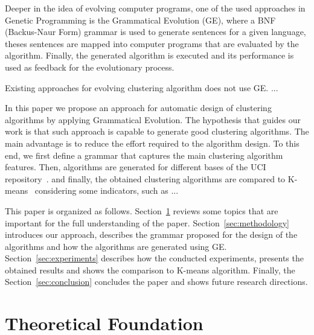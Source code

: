 \documentclass[journal]{IEEEtran}
\begin{document}
	Deeper in the idea of evolving computer programs, one of the used approaches in Genetic Programming is the Grammatical Evolution (GE), where a BNF (Backus-Naur Form) grammar is used to generate sentences for a given language, theses sentences are mapped into  computer programs that are evaluated by the algorithm. Finally, the generated algorithm is executed and its performance is used as feedback for the evolutionary process.
	
        Existing approaches for evolving clustering algorithm does not use GE. ...



In this paper we propose an approach for automatic design of clustering algorithms by applying Grammatical Evolution. The hypothesis that guides our work is that such approach is capable to generate good clustering algorithms. The main advantage is to reduce the effort required to the algorithm design. To this end, we first define a grammar that captures the main clustering algorithm features. Then, algorithms are generated for different bases of the UCI repository~\cite{}. and finally, the obtained clustering algorithms are compared to K-means~\cite{} considering some indicators, such as ...


	
     This paper is organized as follows. Section~\ref{sec:theoretical_foudation} reviews some topics that are important for the full understanding of the paper. Section~\ref{sec:methodology} introduces our approach,  describes the grammar proposed for the design of the algorithms and how the algorithms are generated using GE. Section~\ref{sec:experiments} describes how the conducted experiments,  presents the obtained results and shows the comparison to K-means algorithm. Finally, the Section~\ref{sec:conclusion} concludes the paper and shows future research directions.
	

	
	\section{Theoretical Foundation} \label{sec:theoretical_foudation}
	
\end{document}
